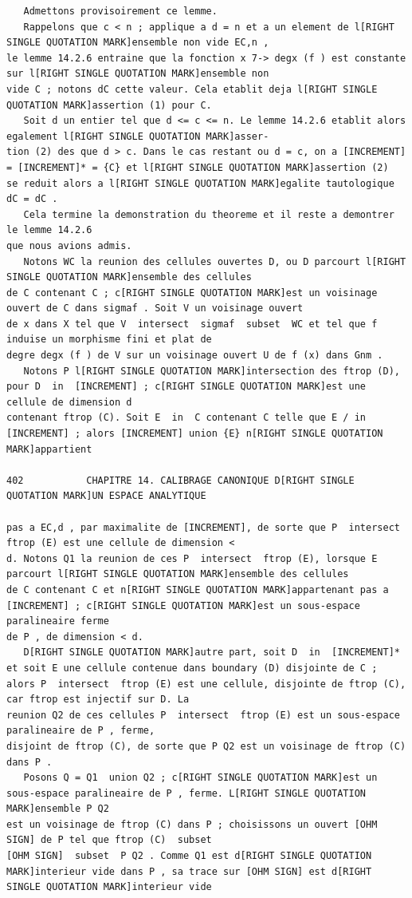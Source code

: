 \documentclass[
  11pt,
]{article}
\begin{document}
\begin{lstlisting}
   Admettons provisoirement ce lemme.
   Rappelons que c < n ; applique a d = n et a un element de l[RIGHT SINGLE QUOTATION MARK]ensemble non vide EC,n ,
le lemme 14.2.6 entraine que la fonction x 7-> degx (f ) est constante sur l[RIGHT SINGLE QUOTATION MARK]ensemble non
vide C ; notons dC cette valeur. Cela etablit deja l[RIGHT SINGLE QUOTATION MARK]assertion (1) pour C.
   Soit d un entier tel que d <= c <= n. Le lemme 14.2.6 etablit alors egalement l[RIGHT SINGLE QUOTATION MARK]asser-
tion (2) des que d > c. Dans le cas restant ou d = c, on a [INCREMENT] = [INCREMENT]* = {C} et l[RIGHT SINGLE QUOTATION MARK]assertion (2)
se reduit alors a l[RIGHT SINGLE QUOTATION MARK]egalite tautologique dC = dC .
   Cela termine la demonstration du theoreme et il reste a demontrer le lemme 14.2.6
que nous avions admis.
   Notons WC la reunion des cellules ouvertes D, ou D parcourt l[RIGHT SINGLE QUOTATION MARK]ensemble des cellules
de C contenant C ; c[RIGHT SINGLE QUOTATION MARK]est un voisinage ouvert de C dans sigmaf . Soit V un voisinage ouvert
de x dans X tel que V  intersect  sigmaf  subset  WC et tel que f induise un morphisme fini et plat de
degre degx (f ) de V sur un voisinage ouvert U de f (x) dans Gnm .
   Notons P l[RIGHT SINGLE QUOTATION MARK]intersection des ftrop (D), pour D  in  [INCREMENT] ; c[RIGHT SINGLE QUOTATION MARK]est une cellule de dimension d
contenant ftrop (C). Soit E  in  C contenant C telle que E / in  [INCREMENT] ; alors [INCREMENT] union {E} n[RIGHT SINGLE QUOTATION MARK]appartient

402           CHAPITRE 14. CALIBRAGE CANONIQUE D[RIGHT SINGLE QUOTATION MARK]UN ESPACE ANALYTIQUE

pas a EC,d , par maximalite de [INCREMENT], de sorte que P  intersect  ftrop (E) est une cellule de dimension <
d. Notons Q1 la reunion de ces P  intersect  ftrop (E), lorsque E parcourt l[RIGHT SINGLE QUOTATION MARK]ensemble des cellules
de C contenant C et n[RIGHT SINGLE QUOTATION MARK]appartenant pas a [INCREMENT] ; c[RIGHT SINGLE QUOTATION MARK]est un sous-espace paralineaire ferme
de P , de dimension < d.
   D[RIGHT SINGLE QUOTATION MARK]autre part, soit D  in  [INCREMENT]* et soit E une cellule contenue dans boundary (D) disjointe de C ;
alors P  intersect  ftrop (E) est une cellule, disjointe de ftrop (C), car ftrop est injectif sur D. La
reunion Q2 de ces cellules P  intersect  ftrop (E) est un sous-espace paralineaire de P , ferme,
disjoint de ftrop (C), de sorte que P Q2 est un voisinage de ftrop (C) dans P .
   Posons Q = Q1  union Q2 ; c[RIGHT SINGLE QUOTATION MARK]est un sous-espace paralineaire de P , ferme. L[RIGHT SINGLE QUOTATION MARK]ensemble P Q2
est un voisinage de ftrop (C) dans P ; choisissons un ouvert [OHM SIGN] de P tel que ftrop (C)  subset 
[OHM SIGN]  subset  P Q2 . Comme Q1 est d[RIGHT SINGLE QUOTATION MARK]interieur vide dans P , sa trace sur [OHM SIGN] est d[RIGHT SINGLE QUOTATION MARK]interieur vide
\end{lstlisting}
\end{document}
